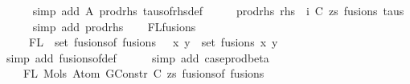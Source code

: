 \begin{isabellebody}
\ \ \ \ \isamarkupfalse%
\ {\isacharparenleft}{\kern0pt}simp\ add{\isacharcolon}{\kern0pt}\ A{}\ prod{\isacharunderscore}{\kern0pt}rhs\ taus{\isacharunderscore}{\kern0pt}of{\isacharunderscore}{\kern0pt}rhs{\isacharunderscore}{\kern0pt}def{\isacharparenright}{\kern0pt}\isanewline
\ \ \isamarkupfalse%
\ \isamarkupfalse%
\ prod{\isacharunderscore}{\kern0pt}rhs{}{\isacharcolon}{\kern0pt}\ {\isachardoublequoteopen}rhs\ {\isacharequal}{\kern0pt}\ {\isacharparenleft}{\kern0pt}i{\isacharcomma}{\kern0pt}\ {\isacharparenleft}{\kern0pt}C{\isacharcomma}{\kern0pt}\ zs{\isacharparenright}{\kern0pt}{\isacharcomma}{\kern0pt}\ fusions{\isacharcomma}{\kern0pt}\ taus{\isacharparenright}{\kern0pt}{\isachardoublequoteclose}\isanewline
\ \ \ \ \isamarkupfalse%
\ {\isacharparenleft}{\kern0pt}simp\ add{\isacharcolon}{\kern0pt}\ prod{\isacharunderscore}{\kern0pt}rhs{\isacharparenright}{\kern0pt}\isanewline
\isanewline
\isanewline
\ \ \isamarkupfalse%
\ FL{\isacharunderscore}{\kern0pt}fusions{\isacharcolon}{\kern0pt}\isanewline
\ \ \ \ {\isachardoublequoteopen}{\isasymUnion}\ {\isacharparenleft}{\kern0pt}FL\ {\isacharbackquote}{\kern0pt}\ set\ {\isacharparenleft}{\kern0pt}fusions{\isacharunderscore}{\kern0pt}of\ fusions{\isacharparenright}{\kern0pt}{\isacharparenright}{\kern0pt}\ {\isacharequal}{\kern0pt}\ {\isacharparenleft}{\kern0pt}{\isasymUnion}\ {\isacharparenleft}{\kern0pt}x{\isacharcomma}{\kern0pt}\ y{\isacharparenright}{\kern0pt}\ {\isasymin}\ set\ fusions{\isachardot}{\kern0pt}\ {\isacharbraceleft}{\kern0pt}x{\isacharcomma}{\kern0pt}\ y{\isacharbraceright}{\kern0pt}{\isacharparenright}{\kern0pt}{\isachardoublequoteclose}\isanewline
\ \ \ \ \isamarkupfalse%
\ {\isacharparenleft}{\kern0pt}simp\ add{\isacharcolon}{\kern0pt}\ fusions{\isacharunderscore}{\kern0pt}of{\isacharunderscore}{\kern0pt}def{\isacharparenright}{\kern0pt}\isanewline
\ \ \ \ \isamarkupfalse%
\ {\isacharparenleft}{\kern0pt}simp\ add{\isacharcolon}{\kern0pt}\ case{\isacharunderscore}{\kern0pt}prod{\isacharunderscore}{\kern0pt}beta{\isacharparenright}{\kern0pt}\isanewline
\isanewline
\ \ \isamarkupfalse%
\isanewline
\ \ \ \ {\isachardoublequoteopen}FL\ {\isacharparenleft}{\kern0pt}Mols{}\ {\isacharparenleft}{\kern0pt}Atom\ {\isacharparenleft}{\kern0pt}GConstr\ C{\isacharparenright}{\kern0pt}\ zs{\isacharparenright}{\kern0pt}\ {\isacharparenleft}{\kern0pt}fusions{\isacharunderscore}{\kern0pt}of\ fusions{\isacharparenright}{\kern0pt}{\isacharparenright}{\kern0pt}\ {\isacharequal}{\kern0pt}\isanewline

\end{isabellebody}
